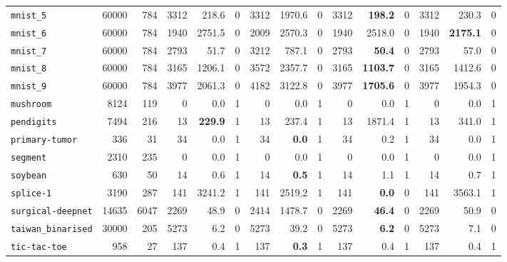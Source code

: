 \begin{tabular}{lccrrrrrrrrrrrr}
\texttt{mnist\_5} & \multicolumn{1}{r}{60000} & \multicolumn{1}{r}{784}  & 3312 & 218.6 & 0 & 3312 & 1970.6 & 0 & 3312 & \textbf{198.2} & 0 & 3312 & 230.3 & 0\\
\texttt{mnist\_6} & \multicolumn{1}{r}{60000} & \multicolumn{1}{r}{784}  & 1940 & 2751.5 & 0 & 2009 & 2570.3 & 0 & 1940 & 2518.0 & 0 & 1940 & \textbf{2175.1} & 0\\
\texttt{mnist\_7} & \multicolumn{1}{r}{60000} & \multicolumn{1}{r}{784}  & 2793 & 51.7 & 0 & 3212 & 787.1 & 0 & 2793 & \textbf{50.4} & 0 & 2793 & 57.0 & 0\\
\texttt{mnist\_8} & \multicolumn{1}{r}{60000} & \multicolumn{1}{r}{784}  & 3165 & 1206.1 & 0 & 3572 & 2357.7 & 0 & 3165 & \textbf{1103.7} & 0 & 3165 & 1412.6 & 0\\
\texttt{mnist\_9} & \multicolumn{1}{r}{60000} & \multicolumn{1}{r}{784}  & 3977 & 2061.3 & 0 & 4182 & 3122.8 & 0 & 3977 & \textbf{1705.6} & 0 & 3977 & 1954.3 & 0\\
\texttt{mushroom} & \multicolumn{1}{r}{8124} & \multicolumn{1}{r}{119}  & 0 & 0.0 & 1 & 0 & 0.0 & 1 & 0 & 0.0 & 1 & 0 & 0.0 & 1\\
\texttt{pendigits} & \multicolumn{1}{r}{7494} & \multicolumn{1}{r}{216}  & 13 & \textbf{229.9} & 1 & 13 & 237.4 & 1 & 13 & 1871.4 & 1 & 13 & 341.0 & 1\\
\texttt{primary-tumor} & \multicolumn{1}{r}{336} & \multicolumn{1}{r}{31}  & 34 & 0.0 & 1 & 34 & \textbf{0.0} & 1 & 34 & 0.2 & 1 & 34 & 0.0 & 1\\
\texttt{segment} & \multicolumn{1}{r}{2310} & \multicolumn{1}{r}{235}  & 0 & 0.0 & 1 & 0 & 0.0 & 1 & 0 & 0.0 & 1 & 0 & 0.0 & 1\\
\texttt{soybean} & \multicolumn{1}{r}{630} & \multicolumn{1}{r}{50}  & 14 & 0.6 & 1 & 14 & \textbf{0.5} & 1 & 14 & 1.1 & 1 & 14 & 0.7 & 1\\
\texttt{splice-1} & \multicolumn{1}{r}{3190} & \multicolumn{1}{r}{287}  & 141 & 3241.2 & 1 & 141 & 2519.2 & 1 & 141 & \textbf{0.0} & 0 & 141 & 3563.1 & 1\\
\texttt{surgical-deepnet} & \multicolumn{1}{r}{14635} & \multicolumn{1}{r}{6047}  & 2269 & 48.9 & 0 & 2414 & 1478.7 & 0 & 2269 & \textbf{46.4} & 0 & 2269 & 50.9 & 0\\
\texttt{taiwan\_binarised} & \multicolumn{1}{r}{30000} & \multicolumn{1}{r}{205}  & 5273 & 6.2 & 0 & 5273 & 39.2 & 0 & 5273 & \textbf{6.2} & 0 & 5273 & 7.1 & 0\\
\texttt{tic-tac-toe} & \multicolumn{1}{r}{958} & \multicolumn{1}{r}{27}  & 137 & 0.4 & 1 & 137 & \textbf{0.3} & 1 & 137 & 0.4 & 1 & 137 & 0.4 & 1\\

\end{tabular}
